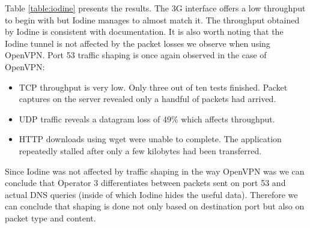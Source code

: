 Table \ref{table:iodine} presents the results. The 3G interface offers a low
throughput to begin with but Iodine manages to almost match it. The throughput
obtained by Iodine is consistent with documentation. It is also worth noting
that the Iodine tunnel is not affected by the packet losses we observe when
using OpenVPN. Port 53 traffic shaping is once again observed in the case of
OpenVPN:

\begin{itemize}
\item TCP throughput is very low. Only three out of ten tests finished. Packet captures on the server revealed only a handful of packets had arrived.
\item UDP traffic reveals a datagram loss of 49\% which affects throughput.
\item HTTP downloads using wget were unable to complete. The application repeatedly stalled after only a few kilobytes had been transferred.
\end{itemize}

Since Iodine was not affected by traffic shaping in the way OpenVPN was we can
conclude that Operator 3 differentiates between packets sent on port 53 and
actual DNS queries (inside of which Iodine hides the useful data). Therefore we can conclude that shaping is done not only based on destination port but also on packet type and content.
